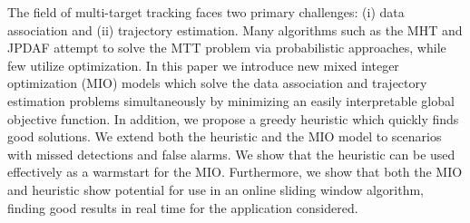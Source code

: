 The field of multi-target tracking faces two primary challenges: (i) data association and (ii) trajectory estimation. Many algorithms such as the MHT and JPDAF attempt to solve the MTT problem via probabilistic approaches, while few utilize optimization. In this paper we introduce new mixed integer optimization (MIO) models which solve the data association and trajectory estimation problems simultaneously by minimizing an easily interpretable global objective function. In addition, we propose a greedy heuristic which quickly finds good solutions. We extend both the heuristic and the MIO model to scenarios with missed detections and false alarms. We show that the heuristic can be used effectively as a warmstart for the MIO. Furthermore, we show that both the MIO and heuristic show potential for use in an online sliding window algorithm, finding good results in real time for the application considered.
